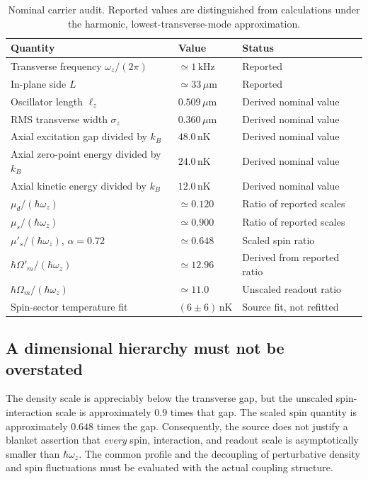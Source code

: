 \documentclass[11pt,a4paper]{article}
\theoremstyle{definition}
\theoremstyle{remark}
\newcommand{\musp}{\mu'_s}
\newcommand{\lop}{\ell_z}
\begin{document}
\begin{table}[htbp]
\centering\small
\caption{Nominal carrier audit. Reported values are distinguished from calculations under the harmonic, lowest-transverse-mode approximation.}
\label{tab:scales}
\begin{tabular}{@{}L{0.40\textwidth}L{0.22\textwidth}L{0.29\textwidth}@{}}
\toprule Quantity & Value & Status\\\midrule
Transverse frequency $\omega_z/(2\pi)$ & $\simeq1\,\mathrm{kHz}$ & Reported\cite{zhang2026}\\
In-plane side $L$ & $\simeq33\,\mu\mathrm m$ & Reported\cite{zhang2026}\\
Oscillator length $\lop$ & $0.509\,\mu\mathrm m$ & Derived nominal value\\
RMS transverse width $\sigma_z$ & $0.360\,\mu\mathrm m$ & Derived nominal value\\
Axial excitation gap divided by $k_B$ & $48.0\,\mathrm{nK}$ & Derived nominal value\\
Axial zero-point energy divided by $k_B$ & $24.0\,\mathrm{nK}$ & Derived nominal value\\
Axial kinetic energy divided by $k_B$ & $12.0\,\mathrm{nK}$ & Derived nominal value\\
$\mu_d/(\hbar\omega_z)$ & $\simeq0.120$ & Ratio of reported scales\\
$\mu_s/(\hbar\omega_z)$ & $\simeq0.900$ & Ratio of reported scales\\
$\musp/(\hbar\omega_z)$, $\alpha=0.72$ & $\simeq0.648$ & Scaled spin ratio\\
$\hbar\Omega'_m/(\hbar\omega_z)$ & $\simeq12.96$ & Derived from reported ratio\cite{zhang2026}\\
$\hbar\Omega_m/(\hbar\omega_z)$ & $\simeq11.0$ & Unscaled readout ratio\\
Spin-sector temperature fit & $(6\pm6)\,\mathrm{nK}$ & Source fit, not refitted\\
\bottomrule
\end{tabular}
\end{table}

\subsection{A dimensional hierarchy must not be overstated}
\label{sec:readout_hierarchy}
The density scale is appreciably below the transverse gap, but the unscaled spin-interaction scale is approximately $0.9$ times that gap. The scaled spin quantity is approximately $0.648$ times the gap. Consequently, the source does not justify a blanket assertion that \emph{every} spin, interaction, and readout scale is asymptotically smaller than $\hbar\omega_z$. The common profile and the decoupling of perturbative density and spin fluctuations must be evaluated with the actual coupling structure.\cite{zhang2026,precursor}
\end{document}

